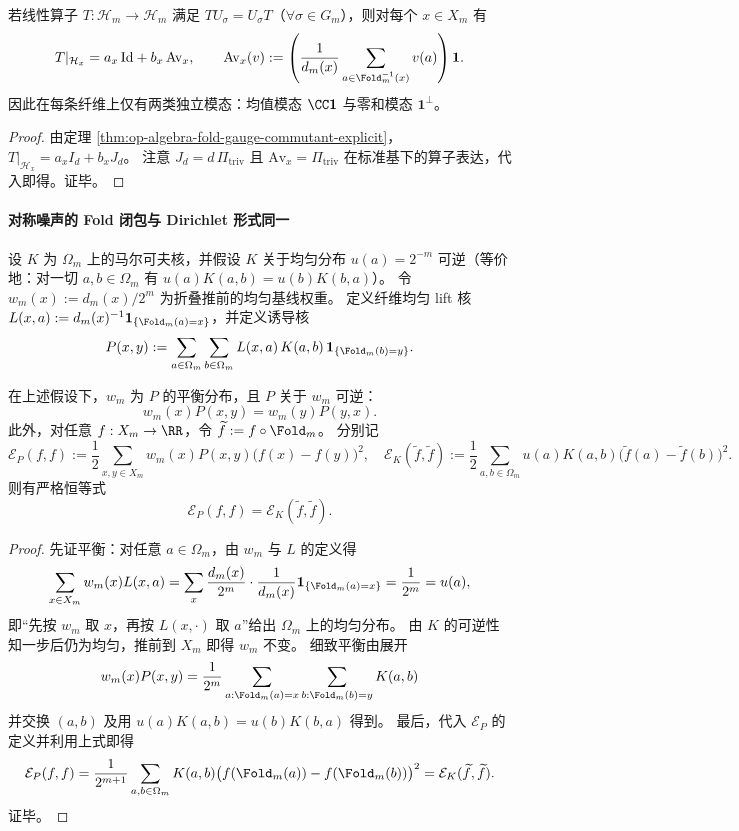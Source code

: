 \begin{corollary}[纤维等变算子的两模态结构]\label{cor:op-algebra-fold-gauge-two-mode}
若线性算子 \(T:\mathcal H_m\to\mathcal H_m\) 满足 \(TU_\sigma=U_\sigma T\)（\(\forall\sigma\in G_m\)），则对每个 \(x\in X_m\) 有
\[
T|_{\mathcal H_x}=a_x\,\mathrm{Id}+b_x\,\mathrm{Av}_x,
\qquad
\mathrm{Av}_x(v):=\left(\frac{1}{d_m(x)}\sum_{a\in\Fold_m^{-1}(x)}v(a)\right)\mathbf 1.
\]
因此在每条纤维上仅有两类独立模态：均值模态 \(\CC\mathbf 1\) 与零和模态 \(\mathbf 1^\perp\)。
\end{corollary}
\begin{proof}
由定理 \ref{thm:op-algebra-fold-gauge-commutant-explicit}，\(T|_{\mathcal H_x}=a_x I_d+b_x J_d\)。
注意 \(J_d=d\,\Pi_{\mathrm{triv}}\) 且 \(\mathrm{Av}_x=\Pi_{\mathrm{triv}}\) 在标准基下的算子表达，代入即得。证毕。
\end{proof}

\paragraph{对称噪声的 Fold 闭包与 Dirichlet 形式同一}
设 \(K\) 为 \(\Omega_m\) 上的马尔可夫核，并假设 \(K\) 关于均匀分布 \(u(a)=2^{-m}\) 可逆（等价地：对一切 \(a,b\in\Omega_m\) 有 \(u(a)K(a,b)=u(b)K(b,a)\)）。
令 \(w_m(x):=d_m(x)/2^m\) 为折叠推前的均匀基线权重。
定义纤维均匀 lift 核 \(L(x,a):=d_m(x)^{-1}\mathbf 1_{\{\Fold_m(a)=x\}}\)，并定义诱导核
\[
P(x,y):=\sum_{a\in\Omega_m}\sum_{b\in\Omega_m} L(x,a)\,K(a,b)\,\mathbf 1_{\{\Fold_m(b)=y\}}.
\]

\begin{proposition}[可逆平衡与能量形式保持]\label{prop:op-algebra-fold-lift-noise-fold-reversibility}
在上述假设下，\(w_m\) 为 \(P\) 的平衡分布，且 \(P\) 关于 \(w_m\) 可逆：
\[
w_m(x)P(x,y)=w_m(y)P(y,x).
\]
此外，对任意 \(f:X_m\to\RR\)，令 \(\widetilde f:=f\circ\Fold_m\)。
分别记
\[
\mathcal E_P(f,f):=\frac12\sum_{x,y\in X_m}w_m(x)P(x,y)\bigl(f(x)-f(y)\bigr)^2,
\quad
\mathcal E_K(\widetilde f,\widetilde f):=\frac12\sum_{a,b\in\Omega_m}u(a)K(a,b)\bigl(\widetilde f(a)-\widetilde f(b)\bigr)^2.
\]
则有严格恒等式
\[
\boxed{\;\mathcal E_P(f,f)=\mathcal E_K(\widetilde f,\widetilde f).\;}
\]
\end{proposition}
\begin{proof}
先证平衡：对任意 \(a\in\Omega_m\)，由 \(w_m\) 与 \(L\) 的定义得
\[
\sum_{x\in X_m} w_m(x)L(x,a)
=\sum_x \frac{d_m(x)}{2^m}\cdot \frac{1}{d_m(x)}\mathbf 1_{\{\Fold_m(a)=x\}}
=\frac{1}{2^m}=u(a),
\]
即“先按 \(w_m\) 取 \(x\)，再按 \(L(x,\cdot)\) 取 \(a\)”给出 \(\Omega_m\) 上的均匀分布。
由 \(K\) 的可逆性知一步后仍为均匀，推前到 \(X_m\) 即得 \(w_m\) 不变。
细致平衡由展开
\[
w_m(x)P(x,y)
=\frac{1}{2^m}\sum_{a:\Fold_m(a)=x}\sum_{b:\Fold_m(b)=y}K(a,b)
\]
并交换 \((a,b)\) 及用 \(u(a)K(a,b)=u(b)K(b,a)\) 得到。
最后，代入 \(\mathcal E_P\) 的定义并利用上式即得
\[
\mathcal E_P(f,f)
=\frac{1}{2^{m+1}}\sum_{a,b\in\Omega_m}K(a,b)\bigl(f(\Fold_m(a))-f(\Fold_m(b))\bigr)^2
=\mathcal E_K(\widetilde f,\widetilde f).
\]
证毕。
\end{proof}

